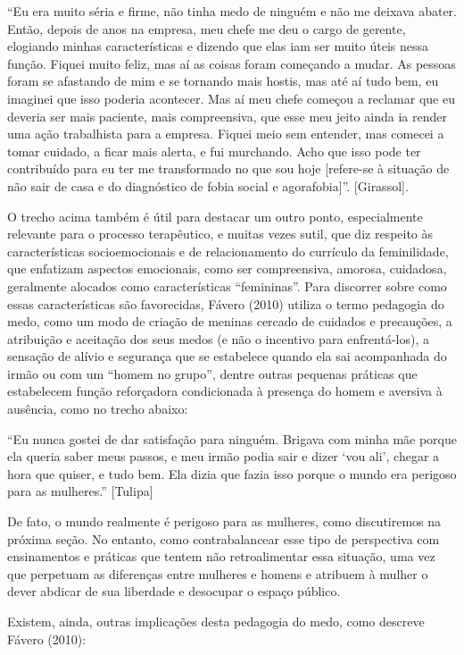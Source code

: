 ``Eu era muito séria e firme, não tinha medo de ninguém e não me deixava abater. Então, depois de anos na empresa, meu chefe me deu o cargo de gerente, elogiando minhas características e dizendo que elas iam ser muito úteis nessa função. Fiquei muito feliz, mas aí as coisas foram começando a mudar. As pessoas foram se afastando de mim e se tornando mais hostis, mas até aí tudo bem, eu imaginei que isso poderia acontecer. Mas aí meu chefe começou a reclamar que eu deveria ser mais paciente, mais compreensiva, que esse meu jeito ainda ia render uma ação trabalhista para a empresa. Fiquei meio sem entender, mas comecei a tomar cuidado, a ficar mais alerta, e fui murchando. Acho que isso pode ter contribuído para eu ter me transformado no que sou hoje [refere-se à situação de não sair de casa e do diagnóstico de fobia social e agorafobia]''. [Girassol].

O trecho acima também é útil para destacar um outro ponto, especialmente relevante para o processo terapêutico, e muitas vezes sutil, que diz respeito às características socioemocionais e de relacionamento do currículo da feminilidade, que enfatizam aspectos emocionais, como ser compreensiva, amorosa, cuidadosa, geralmente alocados como características ``femininas''. Para discorrer sobre como essas características são favorecidas, Fávero (2010) utiliza o termo pedagogia do medo, como um modo de criação de meninas cercado de cuidados e precauções, a atribuição e aceitação dos seus medos (e não o incentivo para enfrentá-los), a sensação de alívio e segurança que se estabelece quando ela sai acompanhada do irmão ou com um ``homem no grupo'', dentre outras pequenas práticas que estabelecem função reforçadora condicionada à presença do homem e aversiva à ausência, como no trecho abaixo:

``Eu nunca gostei de dar satisfação para ninguém. Brigava com minha mãe porque ela queria saber meus passos, e meu irmão podia sair e dizer ‘vou ali’, chegar a hora que quiser, e tudo bem. Ela dizia que fazia isso porque o mundo era perigoso para as mulheres.'' [Tulipa]

De fato, o mundo realmente é perigoso para as mulheres, como discutiremos na próxima seção. No entanto, como contrabalancear esse tipo de perspectiva com ensinamentos e práticas que tentem não retroalimentar essa situação, uma vez que perpetuam as diferenças entre mulheres e homens e atribuem à mulher o dever abdicar de sua liberdade e desocupar o espaço público.

Existem, ainda, outras implicações desta pedagogia do medo, como descreve Fávero (2010): 

